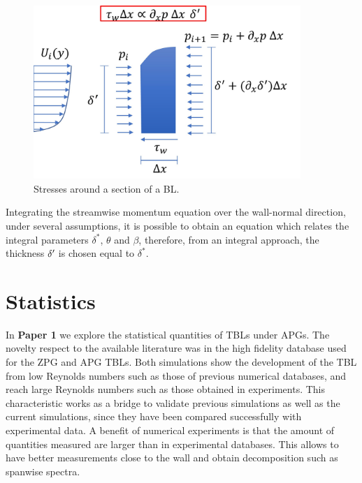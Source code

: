 \begin{figure}
    \centering
    \includegraphics[width=0.90\textwidth]{imgs/schemes/scheme_beta.jpg}
    \caption{Stresses around a section of a BL.}
    \label{fig:scheme_beta}
\end{figure}

Integrating the streamwise momentum equation over the wall-normal direction, under several assumptions, it is possible to obtain an equation which relates the integral parameters $\delta^*$, $\theta$ and $\beta$, therefore, from an integral approach, the thickness $\delta ^{\prime}\mkern-1.2mu$ is chosen equal to $\delta^*$. 



\section{Statistics}
In \textbf{Paper 1} we explore the statistical quantities of TBLs under APGs. The novelty respect to the available literature was in the high fidelity database used for the ZPG and APG TBLs. Both simulations show the development of the TBL from low Reynolds numbers such as those of previous numerical databases, and reach large Reynolds numbers such as those obtained in experiments. This characteristic works as a bridge to validate previous simulations as well as the current simulations, since they have been compared successfully with experimental data.
A benefit of numerical experiments is that the amount of quantities measured are larger than in experimental databases. This allows to have better measurements close to the wall and obtain decomposition such as spanwise spectra.

